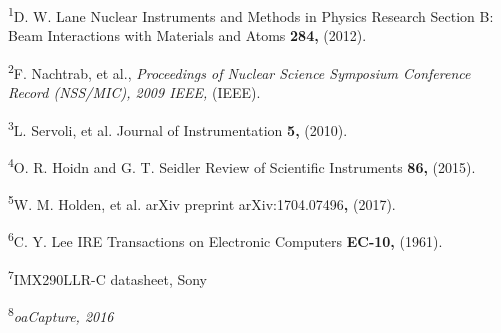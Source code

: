 \textsuperscript{1}D. W. Lane Nuclear Instruments and Methods in Physics
Research Section B: Beam Interactions with Materials and Atoms
\textbf{284,} (2012).

\textsuperscript{2}F. Nachtrab, et al., \emph{Proceedings of Nuclear
Science Symposium Conference Record (NSS/MIC), 2009 IEEE,} (IEEE).

\textsuperscript{3}L. Servoli, et al. Journal of Instrumentation
\textbf{5,} (2010).

\textsuperscript{4}O. R. Hoidn and G. T. Seidler Review of Scientific
Instruments \textbf{86,} (2015).

\textsuperscript{5}W. M. Holden, et al. arXiv preprint
arXiv:1704.07496\textbf{,} (2017).

\textsuperscript{6}C. Y. Lee IRE Transactions on Electronic Computers
\textbf{EC-10,} (1961).

\textsuperscript{7}IMX290LLR-C datasheet, Sony

\textsuperscript{8}\emph{oaCapture, 2016}



